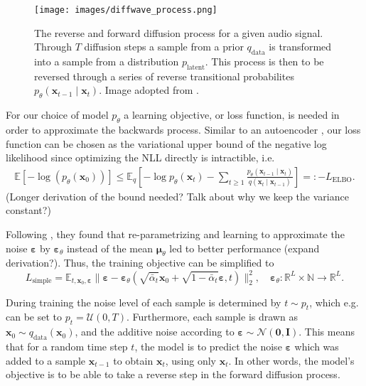 \documentclass{article}
\begin{document}
\begin{figure}[H]
    \centering
    \texttt{[image: images/diffwave\_process.png]}
    \caption{\onehalfspacing The reverse and forward diffusion process for a given audio signal. Through $T$ diffusion steps a sample from a prior $q_{\text{data}}$ is transformed into a sample from a distribution $p_{\text{latent}}$. This process is then to be reversed through a series of reverse transitional probabilites $p_{\theta}(\bm{x}_{t-1} \mid \bm{x}_{t})$. Image adopted from \cite{kong2020diffwave}.}
    \label{fig:diffwave1}
\end{figure}
For our choice of model $p_{\theta}$ a learning objective, or loss function, is needed in order to approximate the backwards process. Similar to an autoencoder \cite{goodfellow2016deep}, our loss function can be chosen as the variational upper bound of the negative log likelihood since optimizing the NLL directly is intractible, i.e.
\begin{align}
\label{vlb1}
    \mathbb{E}[-\log(p_\theta(\bm{x}_0))] \leq \mathbb{E}_q \left[ -\log p_\theta(\bm{x}_t) - \sum_{t\geq 1} \frac{p_\theta(\bm{x}_{t-1}\mid\bm{x}_t)}{q(\bm{x}_t\mid\bm{x}_{t-1})} \right] =: -L_{\text{ELBO}}.
\end{align}
(Longer derivation of the bound needed?
Talk about why we keep the variance constant?)

Following \cite{ho2020denoising}, they found that re-parametrizing and learning to approximate the noise $\bm{\varepsilon}$ by $\bm{\varepsilon}_\theta$ instead of the mean $\bm{\mu}_\theta$ led to better performance (expand derivation?). Thus, the training objective can be simplified to
\begin{equation}
    L_{\text{simple}} = \mathbb{E}_{t, \bm{x}_0, \bm{\varepsilon}} \|\bm{\varepsilon} - \bm{\varepsilon}_\theta(\sqrt{\bar{\alpha}_t} \bm{x}_0 + \sqrt{1-\bar{\alpha}_t} \bm{\varepsilon}, t)\|^2_2, \quad \bm{\varepsilon}_{\theta}: \mathbb{R}^{L}\times \mathbb{N} \rightarrow \mathbb{R}^{L}.
    \label{eq:trainsimple}
\end{equation}

During training the noise level of each sample is determined by $t \sim p_t$, which e.g. can be set to $p_t = \mathcal{U}(0, T)$. Furthermore, each sample is drawn as $\bm{x}_0 \sim q_{\text{data}}(\bm{x}_0)$, and the additive noise according to $\bm{\varepsilon} \sim \mathcal{N}(\bm{0}, \bm{I})$. This means that for a random time step $t$, the model is to predict the noise $\bm{\varepsilon}$ which was added to a sample $\bm{x}_{t-1}$ to obtain $\bm{x}_t$, using only $\bm{x}_t$. In other words, the model's objective is to be able to take a reverse step in the forward diffusion process.
\end{document}
